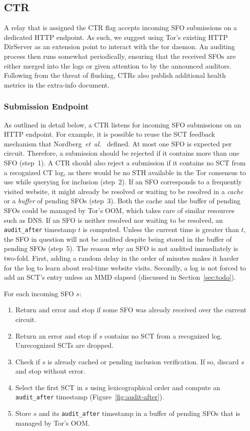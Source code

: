 \subsection{CTR}
A relay that is assigned the CTR flag accepts incoming SFO submissions on a
dedicated HTTP endpoint.  As such, we suggest using Tor's existing HTTP
DirServer as an extension point to interact with the tor daemon.  An auditing
process then runs somewhat periodically, ensuring that the received SFOs are
either merged into the logs or given attention to by the announced auditors.
Following from the threat of flushing, CTRs also publish additional health
metrics in the extra-info document.

\subsubsection{Submission Endpoint}
As outlined in detail below, a CTR listens for incoming SFO submissions on an
HTTP endpoint.  For example, it is possible to reuse the SCT feedback mechanism
that Nordberg~\emph{et~al.}~\cite{nordberg} defined.  At most one SFO is
expected per circuit.  Therefore, a submission should be rejected if it
contains more than one SFO (step~1).  A CTR should also reject a submission if
it contains no SCT from a recognized CT log, as there would be no STH available
in the Tor consensus to use while querying for inclusion (step~2).
If an SFO corresponds to a frequently visited website, it might already be
resolved or waiting to be resolved in a \emph{cache} or a \emph{buffer} of
pending SFOs (step~3).  Both the cache and the buffer of pending SFOs could be
managed by Tor's OOM, which takes care of similar resources such as DNS.  If an
SFO is neither resolved nor waiting to be resolved, an \texttt{audit\_after}
timestamp $t$ is computed.  Unless the current time is greater than $t$, the SFO
in question will not be audited despite being stored in the buffer of pending
SFOs (step~5).  The reason why an SFO is not audited immediately is two-fold.
First, adding a random delay in the order of minutes makes it harder for the log
to learn about real-time website visits.  Secondly, a log is not forced to add
an SCT's entry unless an MMD elapsed (discussed in Section~\ref{sec:todo}).

For each incoming SFO $s$:
\begin{enumerate}
	\item Return and error and stop if some SFO was already received over the
		current circuit.
	\item Return an error and stop if $s$ contains no SCT from a recognized log.
		Unrecognized SCTs are dropped. %
	\item Check if $s$ is already cached or pending inclusion verification.
		If so, discard $s$ and stop without error.
	\item Select the first SCT in $s$ using lexicographical order and compute
		an \texttt{audit\_after} timestamp (Figure~\ref{fig:audit-after}).
	\item Store $s$ and its \texttt{audit\_after} timestamp in a buffer of
		pending SFOs that is managed by Tor's OOM.
\end{enumerate}

